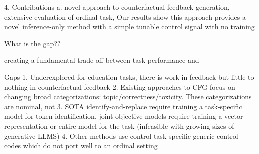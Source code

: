 









4. Contributions
a. novel approach to counterfactual feedback generation, extensive evaluation of ordinal task, Our results show this approach provides a novel inference-only method with a simple tunable control signal with no training

What is the gap??

creating  a fundamental trade-off between task performance and 

Gaps
1. Underexplored for education tasks, there is work in feedback but little to nothing in counterfactual feedback
2. Existing approaches to CFG focus on changing broad categorizations: topic/correctness/toxicity. These categorizations are nominal, not 
3. SOTA identify-and-replace require training a task-specific model for token identification, joint-objective models require training a vector representation or entire model for the task (infeasible with growing sizes of generative LLMS)
4. Other methods use control task-specific generic control codes which do not port well to an ordinal setting

